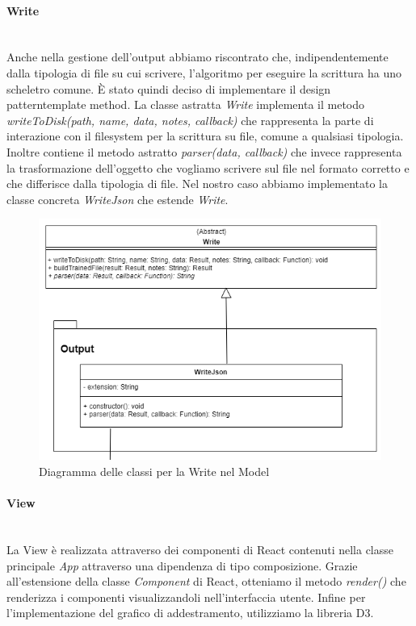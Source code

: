 		\paragraph*{Write} \mbox{} \\[1mm]
		Anche nella gestione dell'output abbiamo riscontrato che, indipendentemente dalla tipologia di file su cui scrivere, l'algoritmo per eseguire la scrittura ha uno scheletro comune. È stato quindi deciso di implementare il design pattern\glosp template method.
		La classe astratta \textit{Write} implementa il metodo \textit{writeToDisk(path, name, data, notes, callback)} che rappresenta la parte di interazione con il filesystem per la scrittura su file, comune a qualsiasi tipologia. Inoltre contiene il metodo astratto \textit{parser(data, callback)} che invece rappresenta la trasformazione dell'oggetto che vogliamo scrivere sul file nel formato corretto e che differisce dalla tipologia di file. Nel nostro caso abbiamo implementato la classe concreta \textit{WriteJson} che estende \textit{Write}.
		\mbox{}
				\begin{figure} [H]
					\begin{center}
						\includegraphics[width=120mm]{img/Diagrammi/write-app.png}
					\end{center}
					\caption{Diagramma delle classi per la Write nel Model}
				\end{figure}

		\paragraph{View} \mbox{} \\[1mm]
		La View è realizzata attraverso dei componenti di React contenuti nella classe principale \textit{App} attraverso una dipendenza di tipo composizione. Grazie all'estensione della classe \textit{Component} di React, otteniamo il metodo \textit{render()} che renderizza i componenti visualizzandoli nell'interfaccia utente.
		Infine per l'implementazione del grafico di addestramento, utilizziamo la libreria D3.
